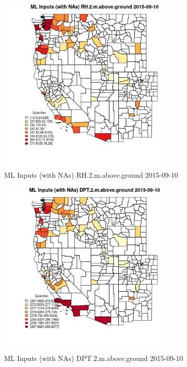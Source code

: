 \begin{figure} 
\centering  
\includegraphics[width=0.77\textwidth]{Code_Outputs/Report_ML_input_PM25_Step4_part_e_de_duplicated_aveswNAs_CountyRH2mabovegroundMean2015-09-10_2015-09-10.jpg} 
\caption{\label{fig:Report_ML_input_PM25_Step4_part_e_de_duplicated_aveswNAsCountyRH2mabovegroundMean2015-09-10_2015-09-10}ML Inputs (with NAs) RH.2.m.above.ground 2015-09-10} 
\end{figure} 
 

\begin{figure} 
\centering  
\includegraphics[width=0.77\textwidth]{Code_Outputs/Report_ML_input_PM25_Step4_part_e_de_duplicated_aveswNAs_CountyDPT2mabovegroundMean2015-09-10_2015-09-10.jpg} 
\caption{\label{fig:Report_ML_input_PM25_Step4_part_e_de_duplicated_aveswNAsCountyDPT2mabovegroundMean2015-09-10_2015-09-10}ML Inputs (with NAs) DPT.2.m.above.ground 2015-09-10} 
\end{figure} 
 

